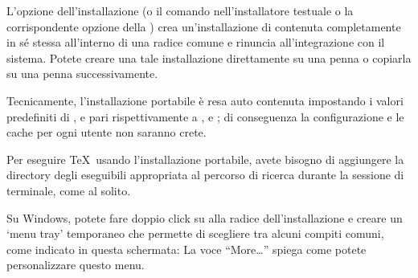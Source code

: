 \documentclass{article}
\begin{document}
L'opzione  dell'installazione (o il comando 
nell'installatore testuale o la corrispondente opzione della \GUI) crea
un'installazione di \TL{} contenuta completamente in sé stessa all'interno
di una radice comune e rinuncia all'integrazione con il sistema. Potete
creare una tale installazione direttamente su una penna \USB{} o copiarla su
una penna \USB{} successivamente.

Tecnicamente, l'installazione portabile è resa auto contenuta impostando
i valori predefiniti di ,  e
 pari rispettivamente a ,
 e ; di conseguenza la
configurazione e le cache per ogni utente non saranno crete.

Per eseguire \TeX\ usando l'installazione portabile, avete bisogno di
aggiungere la directory degli eseguibili appropriata al percorso di ricerca
durante la sessione di terminale, come al solito.

Su Windows, potete fare doppio click su  alla radice
dell'installazione e creare un `menu tray' temporaneo che permette di
scegliere tra alcuni compiti comuni, come indicato in questa schermata:
\medskip
{}
\smallskip
\noindent La voce ``More\ldots'' spiega come potete personalizzare questo menu.
\end{document}
